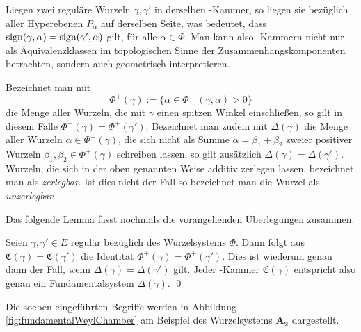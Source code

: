 Liegen zwei reguläre Wurzeln $\gamma, \gamma'$ in derselben \weyl\hyp{}Kammer, so liegen sie bezüglich aller Hyperebenen $P_\alpha$ auf derselben Seite, was bedeutet, dass $\operatorname{sign} (\gamma, \alpha) = \operatorname{sign}( \gamma', \alpha)$ gilt, für alle $\alpha \in \Phi$.
Man kann also \weyl\hyp{}Kammern nicht nur als Äquivalenzklassen im topologischen Sinne der Zusammenhangskomponenten betrachten, sondern auch geometrisch interpretieren.

Bezeichnet man mit
\begin{displaymath}
  \Phi^+(\gamma) := \{ \alpha \in \Phi \mid (\gamma, \alpha) > 0 \}
\end{displaymath}
die Menge aller Wurzeln, die mit $\gamma$ einen spitzen Winkel einschließen, so gilt in diesem Falle $\Phi^+(\gamma) = \Phi^+(\gamma')$.
Bezeichnet man zudem mit $\Delta(\gamma)$ die Menge aller Wurzeln $\alpha \in \Phi^+(\gamma)$, die sich nicht als Summe $\alpha = \beta_1 + \beta_2$ zweier positiver Wurzeln $\beta_1, \beta_2 \in \Phi^+(\gamma)$ schreiben lassen, so gilt zusätzlich $\Delta(\gamma) = \Delta(\gamma')$. 
Wurzeln, die sich in der oben genannten Weise additiv zerlegen lassen, bezeichnet man als \emph{zerlegbar}. 
Ist dies nicht der Fall so bezeichnet man die Wurzel als \emph{unzerlegbar}.

Das folgende Lemma fasst nochmals die vorangehenden Überlegungen zusammen.

\begin{lem}
  \label{lem:correspondenceOfChambers}
  Seien $\gamma, \gamma' \in E$ regulär bezüglich des Wurzelsystems $\Phi$.
  Dann folgt aus $\mathfrak{C}(\gamma) = \mathfrak{C}(\gamma')$ die Identität $\Phi^+(\gamma) = \Phi^+(\gamma')$. 
  Dies ist wiederum genau dann der Fall, wenn $\Delta(\gamma) = \Delta(\gamma')$ gilt.
  Jeder \weyl\hyp{}Kammer $\mathfrak{C}(\gamma)$ entspricht also genau ein Fundamentalsystem $\Delta(\gamma)$. \qed
\end{lem}

Die soeben eingeführten Begriffe werden in Abbildung \ref{fig:fundamentalWeylChamber} am Beispiel des Wurzelsystems $\mathbf{A_2}$ dargestellt.

